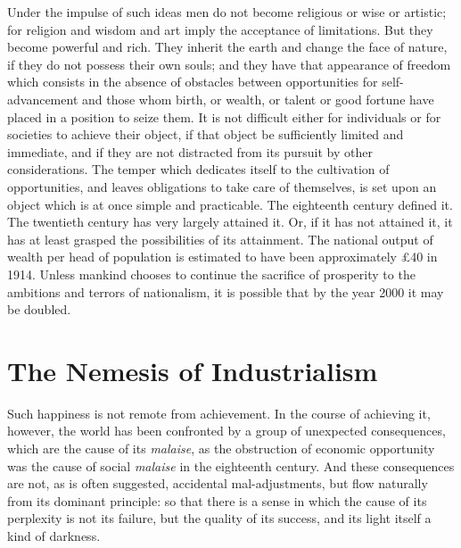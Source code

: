 \documentclass{book}
\begin{document}
Under the impulse of such ideas men do not become religious or wise or artistic; for religion and wisdom and art imply the acceptance of limitations. But they become powerful and rich. They inherit the earth and change the face of nature, if they do not possess their own souls; and they have that appearance of freedom which consists in the absence of obstacles between opportunities for self-advancement and those whom birth, or wealth, or talent or good fortune have placed in a position to seize them. It is not difficult either for individuals or for societies to achieve their object, if that object be sufficiently limited and immediate, and if they are not distracted from its pursuit by other considerations. The temper which dedicates itself to the cultivation of opportunities, and leaves obligations to take care of themselves, is set upon an object which is at once simple and practicable. The eighteenth century defined it. The twentieth century has very largely attained it. Or, if it has not attained it, it has at least grasped the possibilities of its attainment. The national output of wealth per head of population is estimated to have been approximately £40 in 1914. Unless mankind chooses to continue the sacrifice of prosperity to the ambitions and terrors of nationalism, it is possible that by the year 2000 it may be doubled.

\chapter{The Nemesis of Industrialism}
\label{chapter-3}
Such happiness is not remote from achievement. In the course of achieving it, however, the world has been confronted by a group of unexpected consequences, which are the cause of its \emph{malaise}, as the obstruction of economic opportunity was the cause of social \emph{malaise} in the eighteenth century. And these consequences are not, as is often suggested, accidental mal-adjustments, but flow naturally from its dominant principle: so that there is a sense in which the cause of its perplexity is not its failure, but the quality of its success, and its light itself a kind of darkness.
\end{document}
